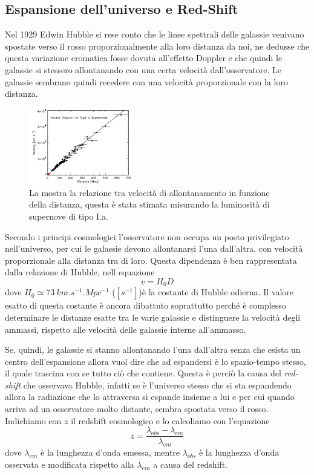 \subsection{Espansione dell'universo e Red-Shift}\label{sec:espansione}

Nel 1929 Edwin Hubble si rese conto che le linee spettrali delle galassie venivano spostate verso il rosso proporzionalmente alla loro distanza da noi, ne dedusse che questa variazione cromatica fosse dovuta all'effetto Doppler e che quindi le galassie si stessero allontanando con una certa velocità dall'osservatore. Le galassie sembrano quindi recedere con una velocità proporzionale con la loro distanza.

\begin{figure}
    \centering
    \includegraphics[width=0.4\textwidth]{immagini/redshift.png}
    \caption{La mostra la relazione tra velocità di allontanamento in funzione della distanza, questa è stata stimata misurando la luminosità di supernove di tipo I.a.}\label{fig:redshift}
\end{figure}

Secondo i principi cosmologici l'osservatore non occupa un posto privilegiato nell'universo, per cui le galassie devono allontanarsi l'una dall'altra, con velocità proporzionale alla distanza tra di loro. Questa dipendenza è ben rappresentata dalla relazione di Hubble, nell equazione~
\begin{equation}\label{eq:hubble}
    v = H_0 D
\end{equation}
dove $H_0 \simeq \SI{73}{km.s^{-1}.Mpc^{-1}}$ ($[s^{-1}]$)è la costante di Hubble odierna. Il valore esatto di questa costante è ancora dibattuto soprattutto perché è complesso determinare le distanze esatte tra le varie galassie e distinguere la velocità degli ammassi, rispetto alle velocità delle galassie interne all'ammasso.

Se, quindi, le galassie si stanno allontanando l'una dall'altra senza che esista un centro dell'espansione allora vuol dire che ad espandersi è lo spazio-tempo stesso, il quale trascina con se tutto ciò che contiene. Questa è perciò la causa del \textit{red-shift} che osservava Hubble, infatti se è l'universo stesso che si sta espandendo allora la radiazione che lo attraversa si espande insieme a lui e per cui quando arriva ad un osservatore molto distante, sembra spostata verso il rosso. Indichiamo con $z$ il redshift cosmologico e lo calcoliamo con l'equazione~
\begin{equation}\label{eq:redshift}
    z = \frac{\lambda_{obs} - \lambda_{em}}{\lambda_{em}}
\end{equation}
dove $\lambda_{em}$ è la lunghezza d'onda emessa, mentre $\lambda_{obs}$ è la lunghezza d'onda osservata e modificata rispetto alla $\lambda_{em}$ a causa del redshift.

